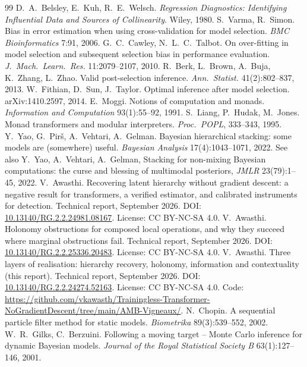 \documentclass[11pt]{article}
\theoremstyle{definition}
\theoremstyle{remark}
\begin{document}
\begin{thebibliography}{99}
 D.~A.~Belsley, E.~Kuh, R.~E.~Welsch. \emph{Regression Diagnostics: Identifying Influential Data and Sources of Collinearity}. Wiley, 1980.
 S.~Varma, R.~Simon. Bias in error estimation when using cross-validation for model selection. \emph{BMC Bioinformatics} 7:91, 2006.
 G.~C.~Cawley, N.~L.~C.~Talbot. On over-fitting in model selection and subsequent selection bias in performance evaluation. \emph{J.\ Mach.\ Learn.\ Res.} 11:2079--2107, 2010.
 R.~Berk, L.~Brown, A.~Buja, K.~Zhang, L.~Zhao. Valid post-selection inference. \emph{Ann.\ Statist.} 41(2):802--837, 2013.
 W.~Fithian, D.~Sun, J.~Taylor. Optimal inference after model selection. arXiv:1410.2597, 2014.
 E.~Moggi. Notions of computation and monads. \emph{Information and Computation} 93(1):55--92, 1991.
 S.~Liang, P.~Hudak, M.~Jones. Monad transformers and modular interpreters. \emph{Proc.\ POPL}, 333--343, 1995.
 Y.~Yao, G.~Pir\v{s}, A.~Vehtari, A.~Gelman. Bayesian hierarchical stacking: some models are (somewhere) useful. \emph{Bayesian Analysis} 17(4):1043--1071, 2022. See also Y.~Yao, A.~Vehtari, A.~Gelman, Stacking for non-mixing Bayesian computations: the curse and blessing of multimodal posteriors, \emph{JMLR} 23(79):1--45, 2022.
 V.~Awasthi. Recovering latent hierarchy without gradient descent: a negative result for transformers, a verified estimator, and calibrated instruments for detection. Technical report, September 2026. DOI: \href{https://doi.org/10.13140/RG.2.2.24981.08167}{10.13140/RG.2.2.24981.08167}. License: CC BY-NC-SA 4.0.
 V.~Awasthi. Holonomy obstructions for composed local operations, and why they succeed where marginal obstructions fail. Technical report, September 2026. DOI: \href{https://doi.org/10.13140/RG.2.2.25336.20483}{10.13140/RG.2.2.25336.20483}. License: CC BY-NC-SA 4.0.
 V.~Awasthi. Three layers of realisation: hierarchy recovery, holonomy, information and contextuality (this report). Technical report, September 2026. DOI: \href{https://doi.org/10.13140/RG.2.2.24274.52163}{10.13140/RG.2.2.24274.52163}. License: CC BY-NC-SA 4.0. Code: \url{https://github.com/vkawasth/Trainingless-Transformer-NoGradientDescent/tree/main/AMB-Vigneaux/}.
 N.~Chopin. A sequential particle filter method for static models. \emph{Biometrika} 89(3):539--552, 2002.
 W.~R.~Gilks, C.~Berzuini. Following a moving target -- Monte Carlo inference for dynamic Bayesian models. \emph{Journal of the Royal Statistical Society B} 63(1):127--146, 2001.

\end{thebibliography}
\end{document}
